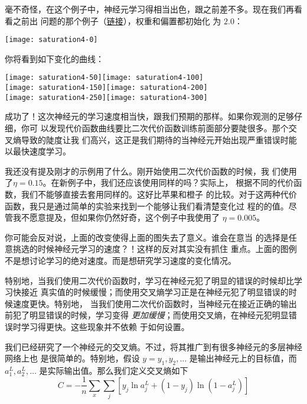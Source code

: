 毫不奇怪，在这个例子中，神经元学习得相当出色，跟之前差不多。现在我们再看看之前出
问题的那个例子（\hyperref[saturation2_anchor]{链接}），权重和偏置都初始化
为 $2.0$：
\begin{center}
  \texttt{[image: saturation4-0]}
\end{center}
你将看到如下变化的曲线：
\begin{center}
  \texttt{[image: saturation4-50]}\texttt{[image: saturation4-100]}\\
  \texttt{[image: saturation4-150]}\texttt{[image: saturation4-200]}\\
  \texttt{[image: saturation4-250]}\texttt{[image: saturation4-300]}
\end{center}

成功了！这次神经元的学习速度相当快，跟我们预期的那样。如果你观测的足够仔细，你可
以发现代价函数曲线要比二次代价函数训练前面部分要陡很多。那个交叉熵导致的陡度让我
们高兴，这正是我们期待的当神经元开始出现严重错误时能以最快速度学习。

我还没有提及刚才的示例用了什么\learningrate{}。刚开始使用二次代价函数的时候，我
们使用了$\eta = 0.15$。在新例子中，我们还应该使用同样的\learningrate{}吗？实际上，
根据不同的代价函数，我们不能够直接去套用同样的\learningrate{}。这好比苹果和橙子
的比较。对于这两种代价函数，我只是通过简单的实验来找到一个能够让我们看清楚变化过
程的\learningrate{}的值。尽管我不愿意提及，但如果你仍然好奇，这个例子中我使用了
$\eta = 0.005$。

你可能会反对说，上面\learningrate{}的改变使得上面的图失去了意义。谁会在意当%
\learningrate{}的选择是任意挑选的时候神经元学习的速度？！这样的反对其实没有抓住
重点。上面的图例不是想讨论学习的绝对速度。而是想研究学习速度的变化情况。

特别地，当我们使用二次代价函数时，学习在神经元犯了明显的错误的时候却比学习快接近
真实值的时候缓慢；而使用交叉熵学习正是在神经元犯了明显错误的时候速度更快。特别地，
当我们使用二次代价函数时，当神经元在接近正确的输出前犯了明显错误的时候，学习变得%
\emph{更加缓慢}；而使用交叉熵，在神经元犯明显错误时学习得更快。这些现象并不依赖
于如何设置\learningrate{}。

我们已经研究了一个神经元的交叉熵。不过，将其推广到有很多神经元的多层神经网络上也
是很简单的。特别地，假设 $y = y_1, y_2, \ldots$ 是输出神经元上的目标值，而
$a^L_1, a^L_2, \ldots$ 是实际输出值。那么我们定义交叉熵如下
\begin{equation}
  C = -\frac{1}{n} \sum_x \sum_j \left[y_j \ln a^L_j + (1-y_j) \ln (1-a^L_j) \right]
  \label{eq:63}\tag{63}
\end{equation}

